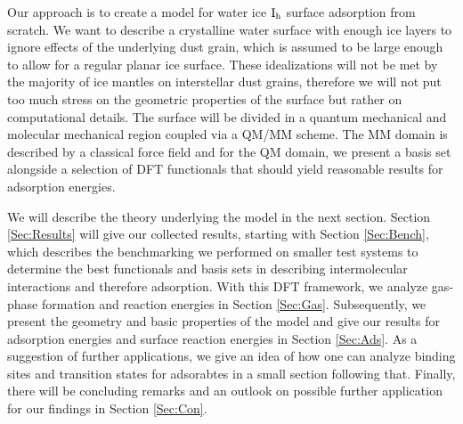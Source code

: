Our approach is to create a model for water ice $\text I_\text h$ surface
adsorption from scratch. We want to describe a crystalline water surface with
enough ice layers to ignore effects of the underlying dust
grain, which is assumed to be large enough to allow for a regular planar ice
surface. These idealizations will not be met by the majority of ice mantles on
interstellar dust grains, therefore we will not put too much stress on the
geometric properties of the surface but rather on computational details. The
surface will be divided in a quantum mechanical and molecular mechanical region
coupled via a QM/MM scheme. The MM domain is described by a classical force
field and for the QM domain, we present a basis set alongside a selection of
DFT functionals that should yield reasonable results for adsorption energies.
% 

We will describe the theory underlying the model in the next section. Section
\ref{Sec:Results} will give our collected results, starting with Section
\ref{Sec:Bench}, which describes the benchmarking we performed on smaller test
systems to determine the best functionals and basis sets in describing
intermolecular interactions and therefore adsorption. With this DFT framework,
we analyze gas-phase formation and reaction energies in Section \ref{Sec:Gas}.
Subsequently, we present the geometry and basic properties of the model and
give our results for adsorption energies and surface reaction energies in
Section \ref{Sec:Ads}. As a suggestion of further applications, we give an idea
of how one can analyze binding sites and transition states for adsorabtes in a
small section following that. Finally, there will be concluding remarks and an
outlook on possible further application for our findings in Section
\ref{Sec:Con}.

